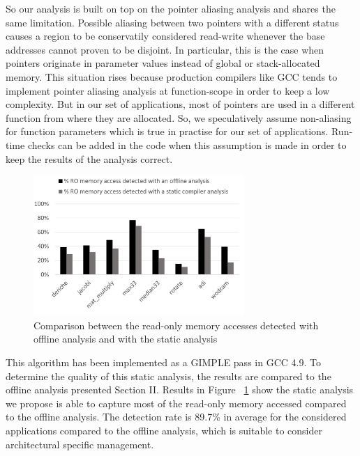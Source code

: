 \documentclass[sigconf]{acmart}
\begin{document}
So our analysis is built on top on the pointer aliasing analysis and shares the same limitation. Possible aliasing between two pointers with a different status causes a region to be conservatily considered read-write whenever the base addresses cannot proven to be disjoint. In particular, this is the case when pointers originate in parameter values instead of global or stack-allocated memory. This situation rises because production compilers like GCC tends to implement pointer aliasing analysis at function-scope in order to keep a low complexity. But in our set of applications, most of pointers are used in a different function from where they are allocated. So, we speculatively assume non-aliasing for function parameters which is true in practise for our set of applications. Run-time checks can be added in the code when this assumption is made in order to keep the results of the analysis correct. 



\begin{figure}
    \centering
    \includegraphics[width=8cm]{./images/plugin_result.png}
    \caption{Comparison between the read-only memory accesses detected with offline analysis and with the static analysis}
    \label{comparAcces}
\end{figure}

This algorithm has been implemented as a GIMPLE pass in GCC 4.9. To determine the quality of this static analysis, the results are compared to the offline analysis presented Section II. Results in Figure ~\ref{comparAcces} show the static analysis we propose is able to capture most of the read-only memory accessed compared to the offline analysis. The detection rate is 89.7\% in average for the considered applications compared to the offline analysis, which is suitable to consider architectural specific management. 
\end{document}
